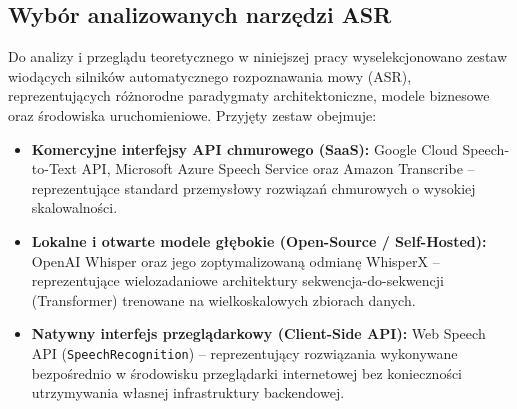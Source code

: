 \subsection{Wybór analizowanych narzędzi ASR}
Do analizy i przeglądu teoretycznego w niniejszej pracy wyselekcjonowano zestaw wiodących silników automatycznego rozpoznawania mowy (ASR), reprezentujących różnorodne paradygmaty architektoniczne, modele biznesowe oraz środowiska uruchomieniowe. Przyjęty zestaw obejmuje:
\begin{itemize}
    \item \textbf{Komercyjne interfejsy API chmurowego (SaaS):} Google Cloud Speech-to-Text API, Microsoft Azure Speech Service oraz Amazon Transcribe -- reprezentujące standard przemysłowy rozwiązań chmurowych o wysokiej skalowalności.
    \item \textbf{Lokalne i otwarte modele głębokie (Open-Source / Self-Hosted):} OpenAI Whisper oraz jego zoptymalizowaną odmianę WhisperX -- reprezentujące wielozadaniowe architektury sekwencja-do-sekwencji (Transformer) trenowane na wielkoskalowych zbiorach danych.
    \item \textbf{Natywny interfejs przeglądarkowy (Client-Side API):} Web Speech API (\texttt{Speech\-Recognition}) -- reprezentujący rozwiązania wykonywane bezpośrednio w środowisku przeglądarki internetowej bez konieczności utrzymywania własnej infrastruktury backendowej.
\end{itemize}

